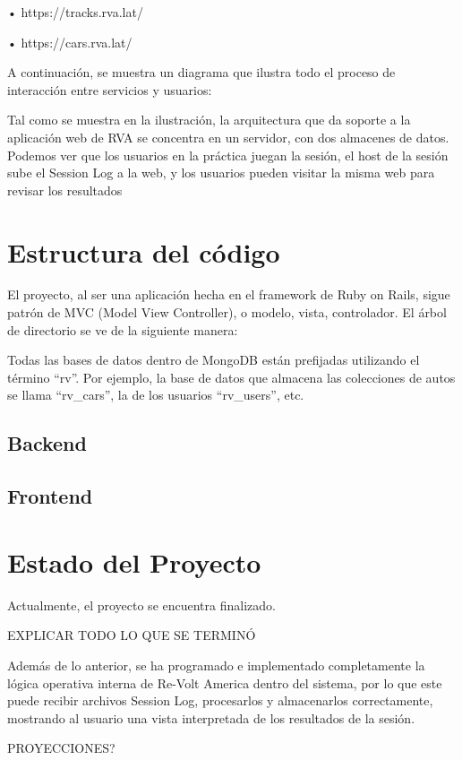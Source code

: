 •	https://tracks.rva.lat/

•	https://cars.rva.lat/

A continuación, se muestra un diagrama que ilustra todo el proceso de interacción entre servicios y usuarios:


Tal como se muestra en la ilustración, la arquitectura que da soporte a la aplicación web de RVA se concentra en un servidor, con dos almacenes de datos. Podemos ver que los usuarios en la práctica juegan la sesión, el host de la sesión sube el Session Log a la web, y los usuarios pueden visitar la misma web para revisar los resultados

\section{Estructura del código}
El proyecto, al ser una aplicación hecha en el framework de Ruby on Rails, sigue patrón de MVC (Model View Controller), o modelo, vista, controlador. El árbol de directorio se ve de la siguiente manera:


Todas las bases de datos dentro de MongoDB están prefijadas utilizando el término “rv”. Por ejemplo, la base de datos que almacena las colecciones de autos se llama “rv\_cars”, la de los usuarios “rv\_users”, etc.

\subsection{Backend}


\subsection{Frontend}


\section{Estado del Proyecto}
Actualmente, el proyecto se encuentra finalizado.

EXPLICAR TODO LO QUE SE TERMINÓ

Además de lo anterior, se ha programado e implementado completamente la lógica operativa interna de Re-Volt America dentro del sistema, por lo que este puede recibir archivos Session Log, procesarlos y almacenarlos correctamente, mostrando al usuario una vista interpretada de los resultados de la sesión.

PROYECCIONES?



